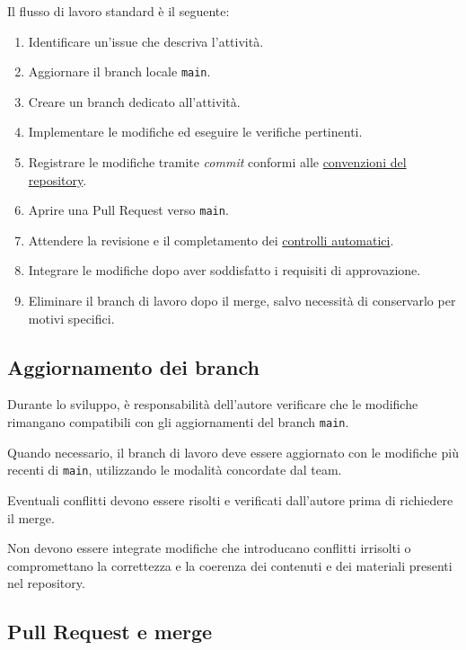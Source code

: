 \documentclass[11pt, a4paper]{article}
\begin{document}
Il flusso di lavoro standard è il seguente:
\begin{enumerate}
    \item Identificare un'issue che descriva l'attività.
    \item Aggiornare il branch locale \texttt{main}.
    \item Creare un branch dedicato all'attività.
    \item Implementare le modifiche ed eseguire le verifiche pertinenti.
    \item Registrare le modifiche tramite \textit{commit} conformi alle \hyperref[sec:linee-guida-per-i-commit]{convenzioni del repository}.
    \item Aprire una Pull Request verso \texttt{main}.
    \item Attendere la revisione e il completamento dei \href{https://github.com/On-By-One-Team/On-By-One.github.io/tree/main/.github/workflows}{controlli automatici}.
    \item Integrare le modifiche dopo aver soddisfatto i requisiti di approvazione.
    \item Eliminare il branch di lavoro dopo il merge, salvo necessità di conservarlo per motivi specifici.
\end{enumerate}

\subsection{Aggiornamento dei branch}

Durante lo sviluppo, è responsabilità dell'autore verificare che le modifiche rimangano compatibili con gli aggiornamenti del branch \texttt{main}.

Quando necessario, il branch di lavoro deve essere aggiornato con le modifiche più recenti di \texttt{main}, utilizzando le modalità concordate dal team.

Eventuali conflitti devono essere risolti e verificati dall'autore prima di richiedere il merge.

Non devono essere integrate modifiche che introducano conflitti irrisolti o compromettano la correttezza e la coerenza dei contenuti e dei materiali presenti nel repository.

\subsection{Pull Request e merge}
\label{subsec:pull-request-e-merge}
\end{document}
